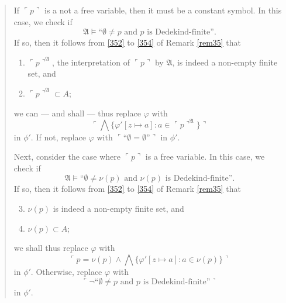 \documentclass[12pt]{article}
\numberwithin{equation}{section}
\begin{document}
\begin{quote}
\begin{enumerate}[label=(\arabic*)]
\begin{enumerate}[label=(F\arabic*), leftmargin=30pt]
            If $\ulcorner p \urcorner$ is a not a free variable, then it must be a constant symbol. In this case, we check if 
            \begin{equation*}
                \mathfrak{A} \models \text{``}\emptyset \neq p \text{ and } p \text{ is Dedekind-finite''.}
            \end{equation*}
            If so, then it follows from \ref{352} to \ref{354} of Remark \ref{rem35} that 
            \begin{enumerate}[label=(\alph*)]
                \item $\ulcorner p \urcorner^{\mathfrak{A}}$, the interpretation of $\ulcorner p \urcorner$ by $\mathfrak{A}$, is indeed a non-empty finite set, and
                \item $\ulcorner p \urcorner^{\mathfrak{A}} \subset A$;
            \end{enumerate}
            we can --- and shall --- thus replace $\varphi$ with 
            \begin{equation*}
                \ulcorner \bigwedge \{\varphi'[z \mapsto a] : a \in \ulcorner p \urcorner^{\mathfrak{A}}\} \urcorner
            \end{equation*}
            in $\phi'$. If not, replace $\varphi$ with $\ulcorner \text{``} \emptyset = \emptyset \text{''} \urcorner$ in $\phi'$. 
        
            Next, consider the case where $\ulcorner p \urcorner$ is a free variable. In this case, we check if
            \begin{equation*}
                \mathfrak{A} \models \text{``}\emptyset \neq \nu(p) \text{ and } \nu(p) \text{ is Dedekind-finite''.}
            \end{equation*}
            If so, then it follows from \ref{352} to \ref{354} of Remark \ref{rem35} that 
            \begin{enumerate}[label=(\alph*)]
                \setcounter{enumiii}{2}
                \item $\nu(p)$ is indeed a non-empty finite set, and
                \item $\nu(p) \subset A$;
            \end{enumerate} 
            we shall thus replace $\varphi$ with 
            \begin{equation*}
                \ulcorner p = \nu(p) \wedge \bigwedge \{\varphi'[z \mapsto a] : a \in \nu(p)\} \urcorner
            \end{equation*}
            in $\phi'$. Otherwise, replace $\varphi$ with 
            \begin{equation*}
                \ulcorner \neg \text{``}\emptyset \neq p \text{ and } p \text{ is Dedekind-finite''} \urcorner
            \end{equation*}
            in $\phi'$.
            

\end{enumerate}
\end{enumerate}
\end{quote}
\end{document}
